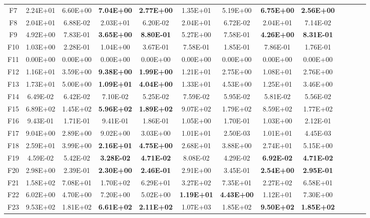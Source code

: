 \begin{table*}[!ht]
\begin{tabular}{|c|cc|cc|cc|cc|cc|cc|}
    F7    & 2.24E+01 & 6.60E+00 & \textbf{7.04E+00} & \textbf{2.77E+00} & 1.35E+01 & 5.19E+00 & \textbf{6.75E+00} & \textbf{2.56E+00} \\
    F8    & 2.04E+01 & 6.88E-02 & 2.03E+01 & 6.20E-02 & 2.04E+01 & 6.72E-02 & 2.04E+01 & 7.14E-02 \\
    F9    & 4.92E+00 & 7.83E-01 & \textbf{3.65E+00} & \textbf{8.80E-01} & 5.27E+00 & 7.58E-01 & \textbf{4.26E+00} & \textbf{8.31E-01} \\
    F10   & 1.03E+00 & 2.28E-01 & 1.04E+00 & 3.67E-01 & 7.58E-01 & 1.85E-01 & 7.86E-01 & 1.76E-01 \\
    F11   & 0.00E+00 & 0.00E+00 & 0.00E+00 & 0.00E+00 & 0.00E+00 & 0.00E+00 & 0.00E+00 & 0.00E+00 \\
    F12   & 1.16E+01 & 3.59E+00 & \textbf{9.38E+00} & \textbf{1.99E+00} & 1.21E+01 & 2.75E+00 & 1.08E+01 & 2.76E+00 \\
    F13   & 1.73E+01 & 5.00E+00 & \textbf{1.09E+01} & \textbf{4.04E+00} & 1.33E+01 & 4.53E+00 & 1.25E+01 & 3.46E+00 \\
    F14   & 6.49E-02 & 6.42E-02 & 7.10E-02 & 5.25E-02 & 7.59E-02 & 5.95E-02 & 5.81E-02 & 5.56E-02 \\
    F15   & 6.89E+02 & 1.45E+02 & \textbf{5.96E+02} & \textbf{1.89E+02} & 9.07E+02 & 1.79E+02 & 8.59E+02 & 1.77E+02 \\
    F16   & 9.43E-01 & 1.71E-01 & 9.41E-01 & 1.86E-01 & 1.05E+00 & 1.70E-01 & 1.03E+00 & 2.12E-01 \\
    F17   & 9.04E+00 & 2.89E+00 & 9.02E+00 & 3.03E+00 & 1.01E+01 & 2.50E-03 & 1.01E+01 & 4.45E-03 \\
    F18   & 2.59E+01 & 3.99E+00 & \textbf{2.16E+01} & \textbf{4.75E+00} & 2.68E+01 & 3.88E+00 & 2.74E+01 & 5.15E+00 \\
    F19   & 4.59E-02 & 5.42E-02 & \textbf{3.28E-02} & \textbf{4.71E-02} & 8.08E-02 & 4.29E-02 & \textbf{6.92E-02} & \textbf{4.71E-02} \\
    F20   & 2.98E+00 & 2.39E-01 & \textbf{2.30E+00} & \textbf{2.46E-01} & 2.91E+00 & 3.45E-01 & \textbf{2.54E+00} & \textbf{2.95E-01} \\
    \cline{1-9}
    F21   & 1.58E+02 & 7.08E+01 & 1.70E+02 & 6.29E+01 & 3.27E+02 & 7.35E+01 & 2.27E+02 & 6.58E+01 \\
    F22   & 6.02E+00 & 4.70E+00 & 7.20E+00 & 5.02E+00 & \textbf{1.19E+01} & \textbf{4.43E+00} & 1.12E+01 & 7.30E+00 \\
    F23   & 9.53E+02 & 1.81E+02 & \textbf{6.61E+02} & \textbf{2.11E+02} & 1.07E+03 & 1.85E+02 & \textbf{9.50E+02} & \textbf{1.85E+02} \\

\end{tabular}
\end{table*}
